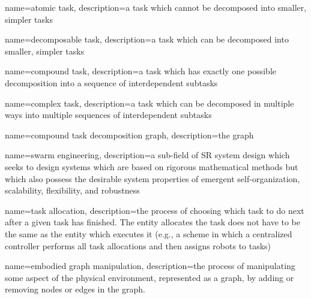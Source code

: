  {
  name={atomic task},
  description={a task which cannot be decomposed into smaller, simpler tasks}
}

 {
  name={decomposable task},
  description={a task which can be decomposed into smaller, simpler tasks}
}

{
  name={compound task},
  description={a task which has exactly one possible decomposition into
    a sequence of interdependent subtasks}
}

{
  name={complex task},
  description={a task which can be decomposed in multiple ways into multiple
    sequences of interdependent subtasks
  }
}

{
  name={compound task decomposition graph},
  description={the graph }
}

{
  name={swarm engineering},
  description={a sub-field of SR system design which seeks to
    design systems which are based on rigorous mathematical methods but which
    also possess the desirable system properties of emergent self-organization,
    scalability, flexibility, and robustness } }

{
  name={task allocation},
  description={the process of choosing which task to do next after a given task
    has finished. The entity allocates the task does not have to be the same as
    the entity which executes it (e.g., a scheme in which a centralized
    controller performs all task allocations and then assigns robots to tasks)
  }
}

{
  name={embodied graph manipulation},
  description={the process of manipulating some aspect of the physical
    environment, represented as a graph, by adding or removing nodes or edges in
    the graph.}
}
